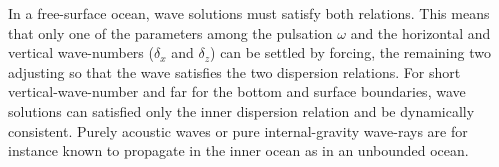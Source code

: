 \documentclass[a4paper,11pt]{article}
\begin{document}
In a free-surface ocean, wave solutions must satisfy both relations. This means that only one of the parameters among the pulsation $\omega$ and the horizontal and vertical wave-numbers ($\delta_x$ and $\delta_z$) can be settled by forcing, the remaining two adjusting so that the wave satisfies the two dispersion relations. For short vertical-wave-number and far for the bottom and surface boundaries, wave solutions can satisfied only the inner dispersion relation and be dynamically consistent. Purely acoustic waves or pure internal-gravity wave-rays are for instance known to propagate in the inner ocean as in an unbounded ocean.\\

\end{document}
